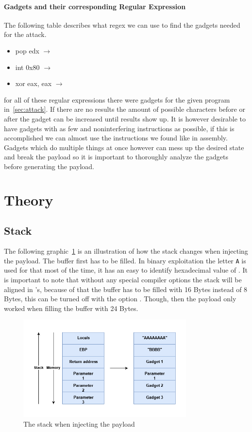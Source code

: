 \documentclass[journal=tosc,submission, notanonymous]{iacrtrans}
\begin{document}
\paragraph{Gadgets and their corresponding Regular Expression}
The following table describes what regex we can use to find the gadgets needed for the attack.
\begin{itemize}
\item pop edx  $\rightarrow$ 
\item int 0x80  $\rightarrow$  
\item xor eax, eax  $\rightarrow$  
\end{itemize}
for all of these regular expressions there were gadgets for the given program in~\cref{sec:attack}. If there are no results the amount of possible characters before or after the gadget can be increased until results show up. It is however desirable to have gadgets with as few and noninterfering instructions as possible, if this is accomplished we can almost use the instructions we found like in assembly. Gadgets which do multiple things at once however can mess up the desired state and break the payload so it is important to thoroughly analyze the gadgets before generating the payload.

\section{Theory}
\subsection{Stack}
The following graphic~\cref{fig:stack} is an illustration of how the stack changes when injecting the payload. The buffer first has to be filled. In binary exploitation the letter \Verb+A+ is used for that most of the time, it has an easy to identify hexadecimal value of . It is important to note that without any special compiler options the stack will be aligned in 's, because of that the buffer has to be filled with 16 Bytes instead of 8 Bytes, this can be turned off with the option . Though, then the payload only worked when filling the buffer with 24 Bytes.
\begin{figure}[h]
  \centering
  \includegraphics[width=0.79\textwidth]{stackropoffsec.png}
  \caption{The stack when injecting the payload}
  \label{fig:stack}
\end{figure}
\end{document}
